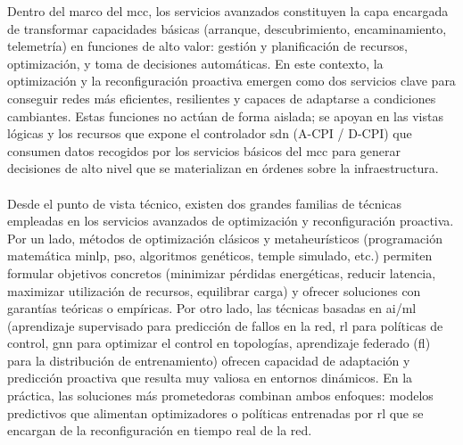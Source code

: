 
Dentro del marco del \gls{mcc}, los servicios avanzados constituyen la capa encargada de transformar capacidades básicas (arranque, descubrimiento, encaminamiento, telemetría) en funciones de alto valor: gestión y planificación de recursos, optimización, y toma de decisiones automáticas. En este contexto, la optimización y la reconfiguración proactiva emergen como dos servicios clave para conseguir redes más eficientes, resilientes y capaces de adaptarse a condiciones cambiantes. Estas funciones no actúan de forma aislada; se apoyan en las vistas lógicas y los recursos que expone el controlador \gls{sdn} (A-CPI / D-CPI) que consumen datos recogidos por los servicios básicos del \gls{mcc} para generar decisiones de alto nivel que se materializan en órdenes sobre la infraestructura.\\
\\
Desde el punto de vista técnico, existen dos grandes familias de técnicas empleadas en los servicios avanzados de optimización y reconfiguración proactiva. Por un lado, métodos de optimización clásicos y metaheurísticos (programación matemática \gls{minlp},  \gls{pso}, algoritmos genéticos, temple simulado, etc.) permiten formular objetivos concretos (minimizar pérdidas energéticas, reducir latencia, maximizar utilización de recursos, equilibrar carga) y ofrecer soluciones con garantías teóricas o empíricas. Por otro lado, las técnicas basadas en \gls{ai}/\gls{ml} (aprendizaje supervisado para predicción de fallos en la red, \gls{rl} para políticas de control, \gls{gnn} para optimizar el control en topologías, aprendizaje federado (\gls{fl}) para la distribución de entrenamiento) ofrecen capacidad de adaptación y predicción proactiva que resulta muy valiosa en entornos dinámicos. En la práctica, las soluciones más prometedoras combinan ambos enfoques: modelos predictivos que alimentan optimizadores o políticas entrenadas por \gls{rl} que se encargan de la reconfiguración en tiempo real de la red.\\
\\
